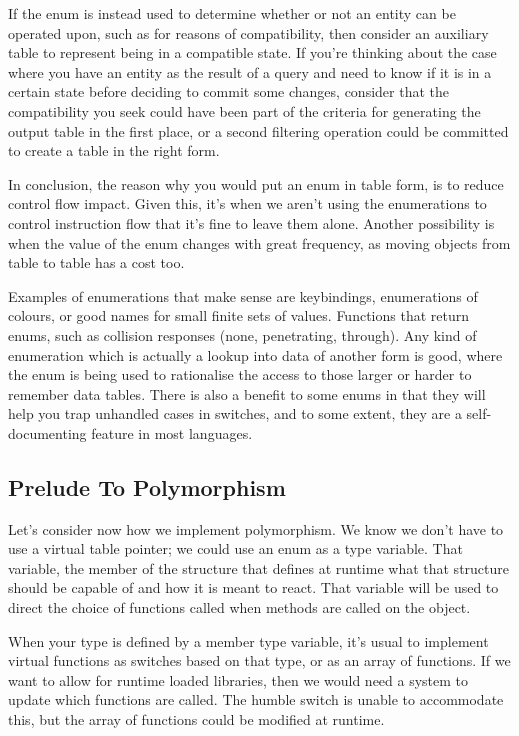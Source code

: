 \documentclass[a4paper,12pt]{book}
\begin{document}
If the enum is instead used to determine whether or not an entity can be operated upon, such as for reasons of compatibility, then consider an auxiliary table to represent being in a compatible state.
If you're thinking about the case where you have an entity as the result of a query and need to know if it is in a certain state before deciding to commit some changes, consider that the compatibility you seek could have been part of the criteria for generating the output table in the first place, or a second filtering operation could be committed to create a table in the right form.

In conclusion, the reason why you would put an enum in table form, is to reduce control flow impact.
Given this, it's when we aren't using the enumerations to control instruction flow that it's fine to leave them alone.
Another possibility is when the value of the enum changes with great frequency, as moving objects from table to table has a cost too.

Examples of enumerations that make sense are keybindings, enumerations of colours, or good names for small finite sets of values.
Functions that return enums, such as collision responses (none, penetrating, through).
Any kind of enumeration which is actually a lookup into data of another form is good, where the enum is being used to rationalise the access to those larger or harder to remember data tables.
There is also a benefit to some enums in that they will help you trap unhandled cases in switches, and to some extent, they are a self-documenting feature in most languages.

\subsection{Prelude To Polymorphism}

Let's consider now how we implement polymorphism.
We know we don't have to use a virtual table pointer;
we could use an enum as a type variable.
That variable, the member of the structure that defines at runtime what that structure should be capable of and how it is meant to react.
That variable will be used to direct the choice of functions called when methods are called on the object.

When your type is defined by a member type variable, it's usual to implement virtual functions as switches based on that type, or as an array of functions.
If we want to allow for runtime loaded libraries, then we would need a system to update which functions are called.
The humble switch is unable to accommodate this, but the array of functions could be modified at runtime.
\end{document}
